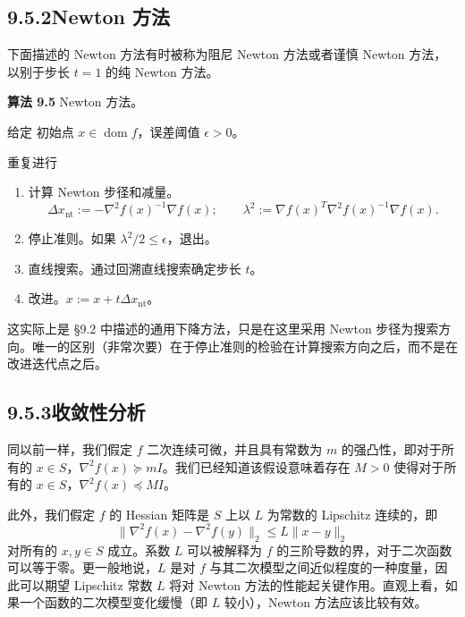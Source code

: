 \documentclass[UTF8,12pt,a4paper,fontset=fandol]{ctexart}
\begin{document}
\subsection*{9.5.2\quad Newton 方法}

下面描述的 Newton 方法有时被称为阻尼 Newton 方法或者谨慎 Newton 方法，以别于步长 $t=1$ 的纯 Newton 方法。

\noindent\textbf{算法 9.5}\quad
Newton 方法。

给定 初始点 $x\in\operatorname{dom} f$，误差阈值 $\epsilon>0$。

重复进行
\begin{enumerate}
\item 计算 Newton 步径和减量。
\[
\Delta x_{\mathrm{nt}}:=-\nabla^2f(x)^{-1}\nabla f(x);\qquad
\lambda^2:=\nabla f(x)^T\nabla^2f(x)^{-1}\nabla f(x).
\]
\item 停止准则。如果 $\lambda^2/2\leq\epsilon$，退出。
\item 直线搜索。通过回溯直线搜索确定步长 $t$。
\item 改进。$x:=x+t\Delta x_{\mathrm{nt}}$。
\end{enumerate}

这实际上是 \S9.2 中描述的通用下降方法，只是在这里采用 Newton 步径为搜索方向。唯一的区别（非常次要）在于停止准则的检验在计算搜索方向之后，而不是在改进迭代点之后。

\subsection*{9.5.3\quad 收敛性分析}

同以前一样，我们假定 $f$ 二次连续可微，并且具有常数为 $m$ 的强凸性，即对于所有的 $x\in S$，$\nabla^2f(x)\succeq mI$。我们已经知道该假设意味着存在 $M>0$ 使得对于所有的 $x\in S$，$\nabla^2f(x)\preceq MI$。

此外，我们假定 $f$ 的 Hessian 矩阵是 $S$ 上以 $L$ 为常数的 Lipschitz 连续的，即
\begin{equation}
\|\nabla^2f(x)-\nabla^2f(y)\|_2\leq L\|x-y\|_2
\tag{9.31}
\end{equation}
对所有的 $x,y\in S$ 成立。系数 $L$ 可以被解释为 $f$ 的三阶导数的界，对于二次函数可以等于零。更一般地说，$L$ 是对 $f$ 与其二次模型之间近似程度的一种度量，因此可以期望 Lipschitz 常数 $L$ 将对 Newton 方法的性能起关键作用。直观上看，如果一个函数的二次模型变化缓慢（即 $L$ 较小），Newton 方法应该比较有效。
\end{document}
